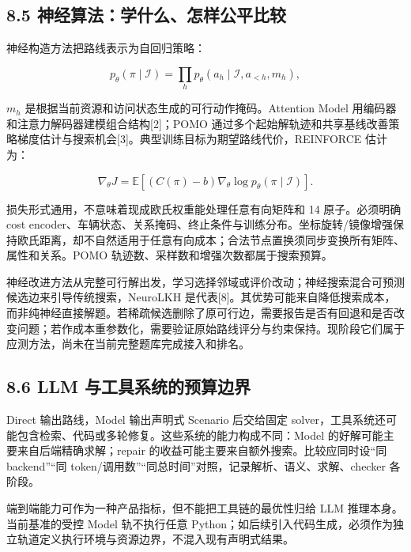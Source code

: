 \documentclass[UTF8,10pt,a4paper,fontset=fandol]{ctexart}
\begin{document}
\subsection*{8.5 神经算法：学什么、怎样公平比较}


神经构造方法把路线表示为自回归策略：


\begin{equation}
p_\theta(\pi\mid\mathcal I)=
\prod_{h}p_\theta(a_h\mid\mathcal I,a_{<h},m_h),
\end{equation}

\ensuremath{m_{h}} 是根据当前资源和访问状态生成的可行动作掩码。Attention Model 用编码器和注意力解码器建模组合结构[2]；POMO 通过多个起始解轨迹和共享基线改善策略梯度估计与搜索机会[3]。典型训练目标为期望路线代价，REINFORCE 估计为：


\begin{equation}
\nabla_\theta J=
\mathbb E\left[(C(\pi)-b)\nabla_\theta\log p_\theta(\pi\mid\mathcal I)\right].
\end{equation}

损失形式通用，不意味着现成欧氏权重能处理任意有向矩阵和 14 原子。必须明确 cost encoder、车辆状态、关系掩码、终止条件与训练分布。坐标旋转/\allowbreak{}镜像增强保持欧氏距离，却不自然适用于任意有向成本；合法节点置换须同步变换所有矩阵、属性和关系。POMO 轨迹数、采样数和增强次数都属于搜索预算。


神经改进方法从完整可行解出发，学习选择邻域或评价改动；神经搜索混合可预测候选边来引导传统搜索，NeuroLKH 是代表[8]。其优势可能来自降低搜索成本，而非纯神经直接解题。若稀疏候选删除了原可行边，需要报告是否有回退和是否改变问题；若作成本重参数化，需要验证原始路线评分与约束保持。现阶段它们属于应测方法，尚未在当前完整题库完成接入和排名。


\subsection*{8.6 LLM 与工具系统的预算边界}


Direct 输出路线，Model 输出声明式 Scenario 后交给固定 solver，工具系统还可能包含检索、代码或多轮修复。这些系统的能力构成不同：Model 的好解可能主要来自后端精确求解；repair 的收益可能主要来自额外搜索。比较应同时设“同 backend”“同 token/\allowbreak{}调用数”“同总时间”对照，记录解析、语义、求解、checker 各阶段。


端到端能力可作为一种产品指标，但不能把工具链的最优性归给 LLM 推理本身。当前基准的受控 Model 轨不执行任意 Python；如后续引入代码生成，必须作为独立轨道定义执行环境与资源边界，不混入现有声明式结果。
\end{document}

